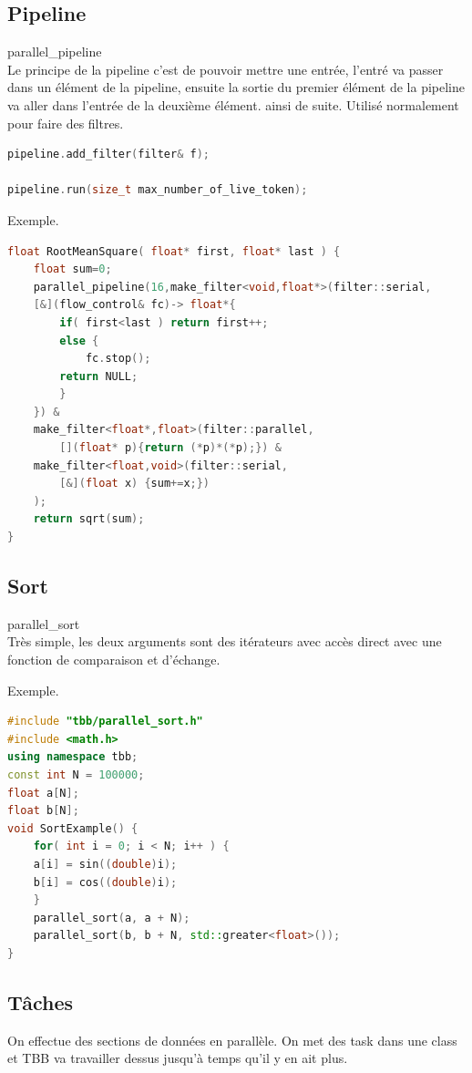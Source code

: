 \documentclass[oneside]{book}
\begin{document}
\subsection{Pipeline}
parallel\_pipeline\\
Le principe de la pipeline c'est de pouvoir mettre une entrée, l'entré va passer dans un élément de la pipeline, ensuite la sortie du premier élément de la pipeline va aller dans l'entrée de la deuxième élément. ainsi de suite. Utilisé normalement pour faire des filtres.\\
\begin{lstlisting}[language=c++]
pipeline.add_filter(filter& f);

pipeline.run(size_t max_number_of_live_token);
\end{lstlisting}
Exemple. 
\begin{lstlisting}[language=c++]
float RootMeanSquare( float* first, float* last ) {
	float sum=0;
	parallel_pipeline(16,make_filter<void,float*>(filter::serial,
	[&](flow_control& fc)-> float*{
		if( first<last ) return first++;
		else {
			fc.stop();
		return NULL;
		}
	}) &
	make_filter<float*,float>(filter::parallel,
		[](float* p){return (*p)*(*p);}) &
	make_filter<float,void>(filter::serial,
		[&](float x) {sum+=x;})
	);
	return sqrt(sum);
}
\end{lstlisting}

\subsection{Sort} parallel\_sort\\

Très simple, les deux arguments sont des itérateurs avec accès direct avec une fonction de comparaison et d'échange.

Exemple.

\begin{lstlisting}[language=c++]
#include "tbb/parallel_sort.h"
#include <math.h>
using namespace tbb;
const int N = 100000;
float a[N];
float b[N];
void SortExample() {
	for( int i = 0; i < N; i++ ) {
	a[i] = sin((double)i);
	b[i] = cos((double)i);
	}
	parallel_sort(a, a + N);
	parallel_sort(b, b + N, std::greater<float>());
}
\end{lstlisting}

\subsection{Tâches}
On effectue des sections de données en parallèle. On met des task dans une class et TBB va travailler dessus jusqu'à temps qu'il y en ait plus.\\
\end{document}
